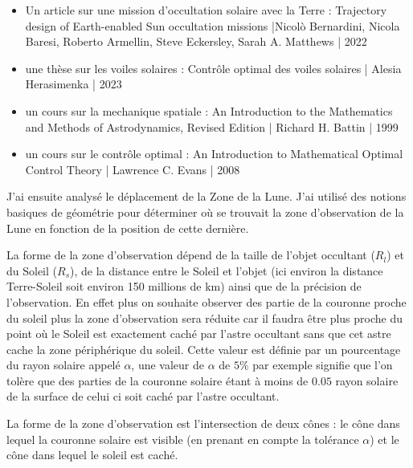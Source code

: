\documentclass[11pt]{article} %
\begin{document}
		\begin{itemize}
			\item Un article sur une mission d'occultation solaire avec la Terre : Trajectory design of Earth-enabled Sun occultation missions |Nicolò Bernardini, Nicola Baresi, Roberto Armellin, Steve Eckersley, Sarah A. Matthews | 2022
			\item une thèse sur les voiles solaires : Contrôle optimal des voiles solaires | Alesia Herasimenka | 2023
			\item un cours sur la mechanique spatiale : An Introduction to the 
			Mathematics and Methods of 
			Astrodynamics, Revised Edition | Richard H. Battin | 1999 
			\item un cours sur le contrôle optimal : An Introduction to Mathematical
			Optimal Control Theory | Lawrence C. Evans | 2008
		\end{itemize}
		
		
		J'ai ensuite analysé le déplacement de la \gls{Zone} de la Lune. J'ai utilisé des notions basiques de géométrie pour déterminer où se trouvait la zone d'observation de la Lune en fonction de la position de cette dernière.
		
		La forme de la zone d'observation dépend de la taille de l'objet occultant ($R_l$) et du Soleil ($R_s$), de la distance entre le Soleil et l'objet (ici environ la distance Terre-Soleil soit environ 150 millions de km) ainsi que de la précision de l'observation. En effet plus on souhaite observer des partie de la couronne proche du soleil plus la zone d'observation sera réduite car il faudra être plus proche du point où le Soleil est exactement caché par l'astre occultant sans que cet astre cache la zone périphérique du soleil. Cette valeur est définie par un pourcentage du rayon solaire appelé $\alpha$, une valeur de $\alpha$ de $5\%$ par exemple signifie que l'on tolère que des parties de la couronne solaire étant à moins de $0.05$ rayon solaire de la surface de celui ci soit caché par l'astre occultant.
		
		La forme de la zone d'observation est l'intersection de deux cônes : le cône dans lequel la couronne solaire est visible (en prenant en compte la tolérance $\alpha$) et le cône dans lequel le soleil est caché.
		
\end{document}

